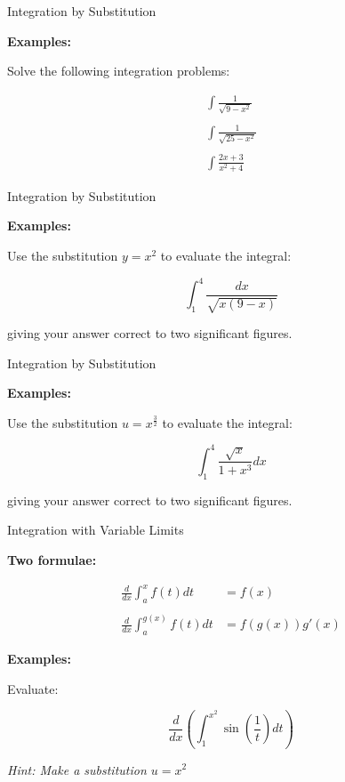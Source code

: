 \documentclass[10pt]{beamer}
\begin{document}
\begin{frame}{Integration by Substitution}

\textbf{Examples:}

Solve the following integration problems:

\begin{align*}
\int \frac{1}{\sqrt{9-x^2}} \\ \\
\int \frac{1}{\sqrt{25-x^2}} \\ \\
\int \frac{2x+3}{x^2+4} 
\end{align*}

\end{frame}

\begin{frame}{Integration by Substitution}

\textbf{Examples:}

Use the substitution $y = x^2$ to evaluate the integral:

\begin{equation*}
\int_1^4 \frac{dx}{\sqrt{x(9-x)}}
\end{equation*}

giving your answer correct to two significant figures.
\end{frame}

\begin{frame}{Integration by Substitution}

\textbf{Examples:}

Use the substitution $u = x^{\frac32}$ to evaluate the integral:

\begin{equation*}
\int_1^4 \frac{\sqrt{x}}{1+x^3}dx
\end{equation*}

giving your answer correct to two significant figures.
\end{frame}

\begin{frame}{Integration with Variable Limits}

\textbf{Two formulae:}

\begin{align*}
\frac{d}{dx}\int_a^x f(t)dt &= f(x) \\ \\
\frac{d}{dx}\int_a^{g(x)} f(t)dt &= f(g(x))g'(x)
\end{align*}

\textbf{Examples:}

Evaluate:

\begin{equation*}
\frac{d}{dx}\left(\int_1^{x^2} \sin\left(\frac1t\right)dt\right)
\end{equation*}

\textit{Hint: Make a substitution $u = x^2$}

\end{frame}
\end{document}
